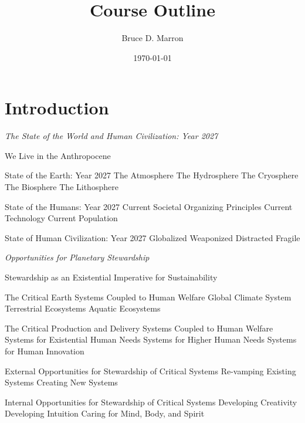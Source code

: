 \documentclass[12pt, letterpaper]{article}
\title{\vspace{-15mm}\fontsize{14pt}{10pt}
                    \selectfont \textbf{Course Outline}   %
                    \vspace{-7mm}
      }
\author{
     \normalsize Bruce D. Marron \\                     %
     \vspace{-5mm}
}
\date{\normalsize \today}
\begin{document}
\begin{singlespacing}
\maketitle                                      %
\end{singlespacing}
\thispagestyle{fancy}                           %


\section{Introduction}

\large
\begin{flushleft}
\textit{The State of the World and Human Civilization: Year 2027}
\end{flushleft}

\normalsize
\begin{outline}[enumerate]
\1 We Live in the Anthropocene

\1 State of the Earth: Year 2027
\2 The Atmosphere 
\2 The Hydrosphere 
\2 The Cryosphere
\2 The Biosphere
\2 The Lithosphere

\1 State of the Humans: Year 2027
\2 Current Societal Organizing Principles 
\2 Current Technology
\2 Current Population

\1 State of Human Civilization: Year 2027
\2 Globalized
\2 Weaponized
\2 Distracted
\2 Fragile
\end{outline}

\pagebreak

\large
\begin{flushleft}
\textit{Opportunities for Planetary Stewardship}
\end{flushleft}

\normalsize
\begin{outline}[enumerate]
\1 Stewardship as an Existential Imperative for Sustainability

\1 The Critical Earth Systems Coupled to Human Welfare
\2 Global Climate System
\2 Terrestrial Ecosystems
\2 Aquatic Ecosystems

\1 The Critical Production and Delivery Systems Coupled to Human Welfare
\2 Systems for Existential Human Needs 
\2 Systems for Higher Human Needs 
\2 Systems for Human Innovation 

\1 External Opportunities for Stewardship of Critical Systems
\2 Re-vamping Existing Systems
\2 Creating New Systems

\1 Internal Opportunities for Stewardship of Critical Systems
\2 Developing Creativity
\2 Developing Intuition
\2 Caring for Mind, Body, and Spirit

\end{outline}
\end{document}
